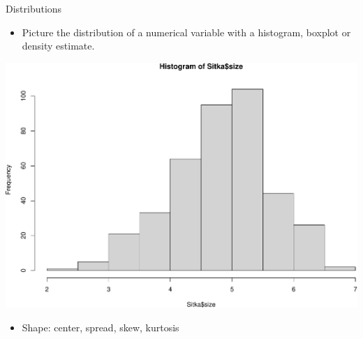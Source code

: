 \documentclass[
  ignorenonframetext,
]{beamer}
\newenvironment{Shaded}{\begin{snugshade}}{\end{snugshade}}
\newcommand{\KeywordTok}[1]{\textcolor[rgb]{0.13,0.29,0.53}{\textbf{#1}}}
\newcommand{\NormalTok}[1]{#1}
\newcommand{\OperatorTok}[1]{\textcolor[rgb]{0.81,0.36,0.00}{\textbf{#1}}}
\providecommand{\tightlist}{%
  \setlength{\itemsep}{0pt}\setlength{\parskip}{0pt}}
\begin{document}
\begin{frame}[fragile]{Distributions}
\protect\hypertarget{distributions-1}{}

\begin{itemize}
\tightlist
\item
  Picture the distribution of a numerical variable with a histogram,
  boxplot or density estimate.
\end{itemize}

\begin{Shaded}
\end{Shaded}

\includegraphics[height=0.5\textheight]{review_files/figure-beamer/unnamed-chunk-3-1}

\begin{itemize}
\tightlist
\item
  Shape: center, spread, skew, kurtosis
\end{itemize}

\end{frame}
\end{document}
